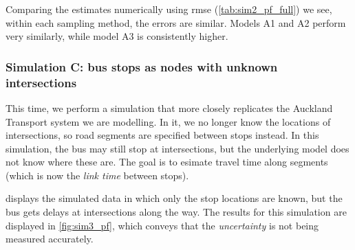 Comparing the estimates numerically using \gls{rmse} (\cref{tab:sim2_pf_full}) we see, within each sampling method, the errors are similar. Models A1 and A2 perform very similarly, while model A3 is consistently higher.



\subsubsection{Simulation C: bus stops as nodes with unknown intersections}
\label{sec:vehicle_sim_C}

This time, we perform a simulation that more closely replicates the Auckland Transport system we are modelling. In it, we no longer know the locations of intersections, so road segments are specified between stops instead. In this simulation, the bus may still stop at intersections, but the underlying model does not know where these are. The goal is to esimate travel time along segments (which is now the \emph{link time} between stops).




 displays the simulated data in which only the stop locations are known, but the bus gets delays at intersections along the way. The results for this simulation are displayed in \cref{fig:sim3_pf}, which conveys that the \emph{uncertainty} is not being measured accurately.

